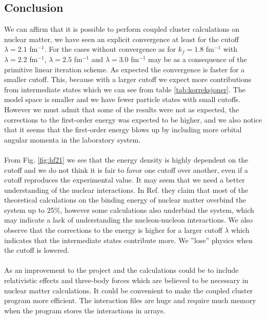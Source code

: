 \subsection{Conclusion}

We can affirm that it is possible to perform coupled cluster calculations on 
nuclear matter, we have seen an explicit convergence at least for the cutoff 
$\lambda=2.1$ fm$^{-1}$. For the cases without convergence as for 
$k_f=1.8$ fm$^{-1}$ with $\lambda=2.2$ fm$^{-1}$, $\lambda=2.5$ fm$^{-1}$ and 
$\lambda=3.0$ fm$^{-1}$ may be as a consequence of the primitive linear iteration scheme.  
As expected the convergence is faster for a smaller cutoff. This, because 
with a larger cutoff we expect more contributions from intermediate states which
we can see from table \ref{tab:korreksjoner}. The model space is smaller and we have fewer particle states with small cutoffs.
However we must admit that some of the results were not as expected, the corrections to the
first-order energy was expected to be higher, and we also notice that it seems
that the first-order energy blows up by including more orbital angular
momenta in the laboratory system. \\
\\
From Fig. \ref{fig:hf21} we see that the energy density is highly dependent on 
the cutoff and we do not think it is fair to favor one cutoff over another, even if a cutoff reproduces the experimental value. %
It may seem 
that we need a better understanding of the nuclear interactions. In Ref.
\cite{inmedium} they claim that most of the theoretical calculations on the binding energy of nuclear
matter  overbind the system up to 25\%, however some calculations also underbind
the system, which may indicate a lack of understanding the nucleon-nucleon interactions.
We also observe that the corrections to the energy is higher for a larger cutoff
$\lambda$ which indicates that the intermediate states contribute more. 
We ''lose'' physics when the cutoff is lowered.\\ 
\\
As an improvement to the project and the
calculations could be to include relativistic effects and three-body forces 
which are believed to be necessary in nuclear matter calculations. It could be 
convenient to make the coupled cluster program more efficient. The interaction 
files are huge and require much memory when the program stores the interactions
in arrays.   
